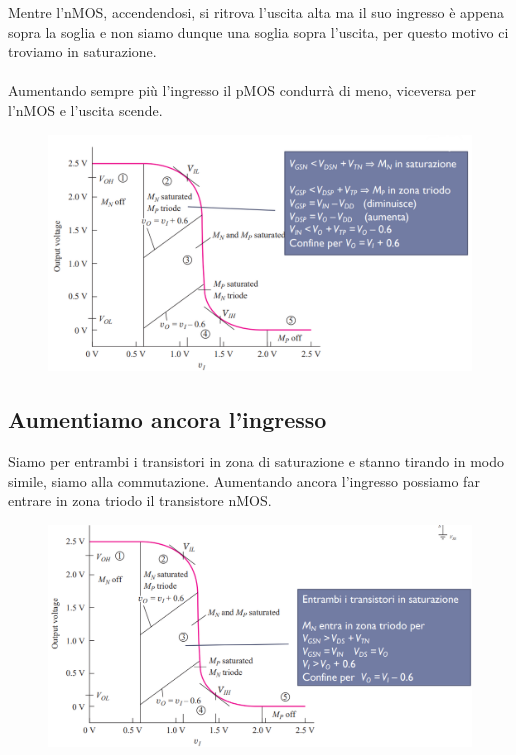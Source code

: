 Mentre l'nMOS, accendendosi, si ritrova l'uscita alta ma il suo ingresso è appena sopra la soglia e non siamo dunque una soglia sopra l'uscita, per questo motivo ci troviamo in saturazione.

\paragraph{}
Aumentando sempre più l'ingresso il pMOS condurrà di meno, viceversa per l'nMOS e l'uscita scende.

\begin{figure}[htbp]
    \centering
    \includegraphics[width=0.8\linewidth]{img/zona_2.png}  
    
\end{figure}


\subsection{Aumentiamo ancora l'ingresso}

Siamo per entrambi i transistori in zona di saturazione e stanno tirando in modo simile, siamo alla commutazione. Aumentando ancora l'ingresso possiamo far entrare in zona triodo il transistore nMOS.


\begin{figure}[htbp]
    \centering
    \includegraphics[width=0.85\linewidth]{zona_3.png}
\end{figure}


